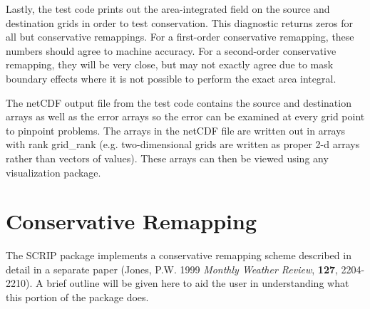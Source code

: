 \documentclass[12pt]{report}
\begin{document}
Lastly, the test code prints out the area-integrated
field on the source and destination grids in order to
test conservation.  This diagnostic returns zeros for
all but conservative remappings.  For a first-order
conservative remapping, these numbers should agree
to machine accuracy.  For a second-order conservative
remapping, they will be very close, but may not exactly
agree due to mask boundary effects where it is not
possible to perform the exact area integral.

The netCDF output file from the test code contains
the source and destination arrays as well as the
error arrays so the error can be examined at every
grid point to pinpoint problems.  The arrays in
the netCDF file are written out in arrays with
rank grid\_rank (e.g. two-dimensional grids are
written as proper 2-d arrays rather than vectors
of values).  These arrays can then be viewed using
any visualization package.

\chapter{Conservative Remapping}

The SCRIP package implements a conservative remapping
scheme described in detail in a separate paper
(Jones, P.W. 1999 {\em Monthly Weather Review}, 
{\bf 127}, 2204-2210).
A brief outline will be given here to aid the
user in understanding what this portion of the
package does.
\end{document}
